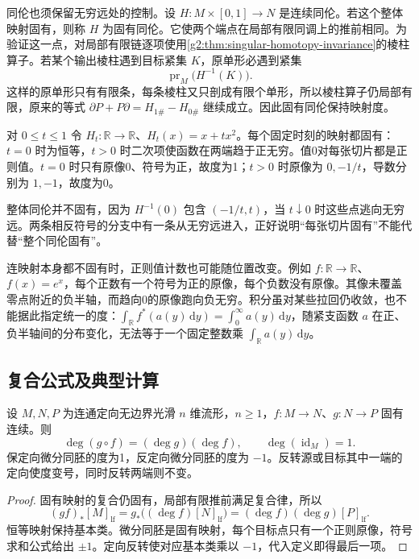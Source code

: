 同伦也须保留无穷远处的控制。设 \(H:M\times[0,1]\to N\) 是连续同伦。若这个整体映射固有，则称 \(H\) 为固有同伦。它使两个端点在局部有限同调上的推前相同。为验证这一点，对局部有限链逐项使用\cref{g2:thm:singular-homotopy-invariance}的棱柱算子。若某个输出棱柱遇到目标紧集 \(K\)，原单形必遇到紧集
\[
	\operatorname{pr}_M\bigl(H^{-1}(K)\bigr).
\]
这样的原单形只有有限条，每条棱柱又只剖成有限个单形，所以棱柱算子仍局部有限，原来的等式 \(\partial P+P\partial=H_{1\#}-H_{0\#}\) 继续成立。因此固有同伦保持映射度。

\begin{example}\label{g2:exm:proper-slices-not-proper-homotopy}
	对 \(0\le t\le1\) 令 \(H_t:\mathbb R\to\mathbb R\)、\(H_t(x)=x+t x^2\)。每个固定时刻的映射都固有：\(t=0\) 时为恒等，\(t>0\) 时二次项使函数在两端趋于正无穷。值0对每张切片都是正则值。\(t=0\) 时只有原像0、符号为正，故度为1；\(t>0\) 时原像为 \(0,-1/t\)，导数分别为 \(1,-1\)，故度为0。

	整体同伦并不固有，因为 \(H^{-1}(0)\) 包含 \((-1/t,t)\)，当 \(t\downarrow0\) 时这些点逃向无穷远。两条相反符号的分支中有一条从无穷远进入，正好说明“每张切片固有”不能代替“整个同伦固有”。
\end{example}

连映射本身都不固有时，正则值计数也可能随位置改变。例如 \(f:\mathbb R\to\mathbb R\)、\(f(x)=e^x\)，每个正数有一个符号为正的原像，每个负数没有原像。其像未覆盖零点附近的负半轴，而趋向0的原像跑向负无穷。积分虽对某些拉回仍收敛，也不能据此指定统一的度：\(\int_{\mathbb R}f^*(a(y)\,\mathrm{d}y)=\int_0^\infty a(y)\,\mathrm{d}y\)，随紧支函数 \(a\) 在正、负半轴间的分布变化，无法等于一个固定整数乘 \(\int_{\mathbb R}a(y)\,\mathrm{d}y\)。

\subsection{复合公式及典型计算}
\label{g2:subsec:1601:04}

\begin{proposition}\label{g2:prop:manifold-degree-laws}
	设 \(M,N,P\) 为连通定向无边界光滑 \(n\) 维流形，\(n\ge1\)，\(f:M\to N\)、\(g:N\to P\) 固有连续。则
	\[
		\deg(g\circ f)=(\deg g)(\deg f),\qquad\deg(\operatorname{id}_M)=1.
	\]
	保定向微分同胚的度为1，反定向微分同胚的度为 \(-1\)。反转源或目标其中一端的定向使度变号，同时反转两端则不变。
\end{proposition}
\begin{proof}
	固有映射的复合仍固有，局部有限推前满足复合律，所以
	\[
		(gf)_*[M]_{\mathrm{lf}}
		=g_*\bigl((\deg f)[N]_{\mathrm{lf}}\bigr)
		=(\deg f)(\deg g)[P]_{\mathrm{lf}}.
	\]
	恒等映射保持基本类。微分同胚是固有映射，每个目标点只有一个正则原像，符号求和公式给出 \(\pm1\)。定向反转使对应基本类乘以 \(-1\)，代入定义即得最后一项。
\end{proof}


